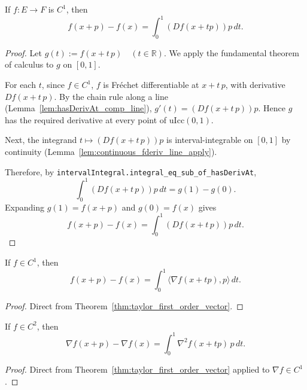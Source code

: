 \begin{theorem}\label{thm:taylor_first_order_vector}
  \leanok{}
  If $f:E\to F$ is $C^1$, then
  \[
    f(x+p)-f(x) = \int_0^1 (Df(x+t p))p\,dt.
  \]
\end{theorem}
\begin{proof}
  \leanok{}
  Let
  \(
    g(t) := f(x+t\,p)\quad (t\in\mathbb{R}).
  \)
  We apply the fundamental theorem of calculus to $g$ on $[0,1]$.

  For each $t$, since $f\in C^1$, $f$ is Fr\'echet differentiable at $x+t\,p$, with derivative
  $Df(x+t\,p)$. By the chain rule along a line (Lemma~\ref{lem:hasDerivAt_comp_line}),
  \(
    g'(t)=(Df(x+t\,p))p.
  \)
  Hence $g$ has the required derivative at every point of $\mathrm{uIcc}(0,1)$.

  Next, the integrand $t\mapsto (Df(x+t\,p))p$ is interval-integrable on $[0,1]$ by
  continuity (Lemma~\ref{lem:continuous_fderiv_line_apply}).

  Therefore, by
  \texttt{intervalIntegral.integral\_eq\_sub\_of\_hasDerivAt},
  \[
    \int_0^1 (Df(x+t\,p))p\,dt = g(1)-g(0).
  \]
  Expanding $g(1)=f(x+p)$ and $g(0)=f(x)$ gives
  \[
    f(x+p)-f(x)=\int_0^1 (Df(x+t\,p))p\,dt.
  \]
\end{proof}

\begin{theorem}\label{thm:taylor_first_order}
  \leanok{}
  If $f\in C^1$, then
  \[
    f(x+p)-f(x) = \int_0^1 \langle \nabla f(x+t p),p\rangle\,dt.
  \]
\end{theorem}
\begin{proof}
  \leanok{}
  Direct from Theorem~\ref{thm:taylor_first_order_vector}.
\end{proof}

\begin{theorem}\label{thm:taylor_second_order_gradient}
  \leanok{}
  If $f\in C^2$, then
  \[
    \nabla f(x+p)-\nabla f(x)=\int_0^1 \nabla^2 f(x+t p)\,p\,dt.
  \]
\end{theorem}
\begin{proof}
  \leanok{}
  Direct from Theorem~\ref{thm:taylor_first_order_vector} applied to $\nabla f \in C^1$.
\end{proof}

